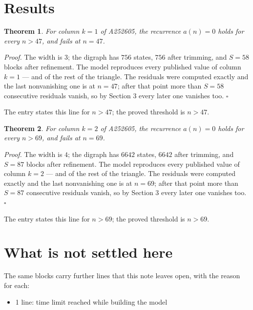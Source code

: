 \documentclass[11pt]{article}
\newtheorem{theorem}{Theorem}
\theoremstyle{definition}
\begin{document}
\section{Results}

\begin{theorem} For column $k = 1$ of A252605, the recurrence $a(n) = 0$ holds for every $n > 47$, and fails at $n = 47$.\end{theorem}

{\itshape Proof.} The width is $3$; the digraph has $756$ states, $756$ after trimming, and $S = 58$ blocks after refinement. The model reproduces every published value of column $k = 1$ --- and of the rest of the triangle. The residuals were computed exactly and the last nonvanishing one is at $n = 47$; after that point more than $S = 58$ consecutive residuals vanish, so by Section 3 every later one vanishes too. $\square$

The entry states this line for $n > 47$; the proved threshold is $n > 47$.

\begin{theorem} For column $k = 2$ of A252605, the recurrence $a(n) = 0$ holds for every $n > 69$, and fails at $n = 69$.\end{theorem}

{\itshape Proof.} The width is $4$; the digraph has $6642$ states, $6642$ after trimming, and $S = 87$ blocks after refinement. The model reproduces every published value of column $k = 2$ --- and of the rest of the triangle. The residuals were computed exactly and the last nonvanishing one is at $n = 69$; after that point more than $S = 87$ consecutive residuals vanish, so by Section 3 every later one vanishes too. $\square$

The entry states this line for $n > 69$; the proved threshold is $n > 69$.

\section{What is not settled here}

The same blocks carry further lines that this note leaves open, with the reason for each:

\begin{itemize}

\item 1 line: time limit reached while building the model

\end{itemize}
\end{document}
